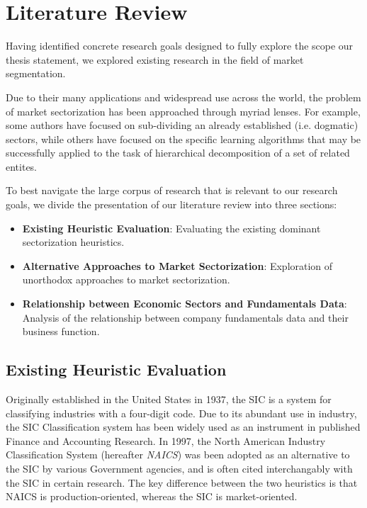 \documentclass[../main.tex]{subfiles}
\begin{document}
    
\chapter{Literature Review} \label{literature_review}

Having identified concrete research goals designed to fully explore the scope our thesis statement, we explored existing research in the field of market segmentation.

Due to their many applications and widespread use across the world, the problem of market sectorization has been approached through myriad lenses. For example, some authors have focused on sub-dividing an already established (i.e. dogmatic) sectors, while others have focused on the specific learning algorithms that may be successfully applied to the task of hierarchical decomposition of a set of related entites.

To best navigate the large corpus of research that is relevant to our research goals, we divide the presentation of our literature review into three sections:

\begin{itemize}
    \item \textbf{Existing Heuristic Evaluation}: Evaluating the existing dominant sectorization heuristics.
    \item \textbf{Alternative Approaches to Market Sectorization}: Exploration of unorthodox approaches to market sectorization.
    \item \textbf{Relationship between Economic Sectors and Fundamentals Data}: Analysis of the relationship between company fundamentals data and their business function.
\end{itemize}


\section{Existing Heuristic Evaluation} \label{literature_review:existing_heuristic_evaluation}

Originally established in the United States in 1937, the SIC is a system for classifying industries with a four-digit code. Due to its abundant use in industry, the SIC Classification system has been widely used as an instrument in published Finance and Accounting Research. In 1997, the North American Industry Classification System (hereafter \textit{NAICS}) was been adopted as an alternative to the SIC by various Government agencies, and is often cited interchangably with the SIC in certain research. The key difference between the two heuristics is that NAICS is production-oriented, whereas the SIC is market-oriented.
\end{document}
